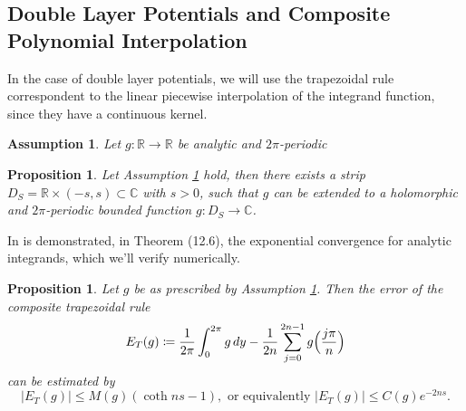 \documentclass[10pt, a4paper, twoside, openright]{book}
\theoremstyle{definition}
\theoremstyle{plain}
\theoremstyle{plain}
\theoremstyle{plain}
\newtheorem{proposition}[subsection]{Proposition}
\theoremstyle{plain}
\theoremstyle{plain}
\theoremstyle{plain}
\theoremstyle{plain}
\newtheorem{assumption}[subsection]{Assumption}
\theoremstyle{plain}
\begin{document}
\subsection{Double Layer Potentials and Composite Polynomial Interpolation}
In the case of double layer potentials, we will use the trapezoidal rule 
correspondent to the linear piecewise interpolation of the integrand function, 
since they have a continuous kernel.
\begin{assumption}
\label{assumption:holom-ext}
 Let $g:\mathbb{R}\to\mathbb{R}$ be analytic and $2\pi$-periodic
\end{assumption}
\begin{proposition}
 Let Assumption \ref{assumption:holom-ext} hold, then there exists a strip $D_S=\mathbb{R}\times(-s, s)\subset\mathbb{C}$ with $s>0$, such that
 $g$ can be extended to a holomorphic and $2\pi$-periodic bounded function $g:D_S\to\mathbb{C}$.
\end{proposition}
In \cite{kress:book} is demonstrated, in Theorem (12.6), the exponential 
convergence for analytic integrands, which we'll verify numerically.
\begin{proposition}
 Let $g$ be as prescribed by Assumption \ref{assumption:holom-ext}. Then the error of the composite trapezoidal rule
 \begin{equation}
  E_T(g)\coloneqq \frac{1}{2\pi}\int_0^{2\pi}g\,dy - \frac{1}{2n}\sum_{j=0}^{2n-1}g\Bigl(\frac{j\pi}{n}\Bigr)
 \end{equation}
 can be estimated by 
 \begin{equation}
  |E_T(g)|\leq M(g)(\coth ns -1), \text{ or equivalently }  |E_T(g)|\leq C(g) e^{-2ns}.
 \end{equation}
\end{proposition}
\end{document}

